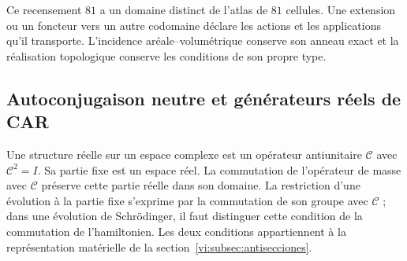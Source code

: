 Ce recensement $81$ a un domaine distinct de l’atlas de $81$ cellules.
Une extension ou un foncteur vers un autre codomaine déclare les actions
et les applications qu’il transporte. L’incidence aréale--volumétrique conserve
son anneau exact et la réalisation topologique conserve les conditions
de son propre type.

\subsection{Autoconjugaison neutre et générateurs réels de CAR}
\label{vi:subsec:majorana-categorias}

Une structure réelle sur un espace complexe est un opérateur antiunitaire
$\mathcal C$ avec $\mathcal C^2=I$. Sa partie fixe est un espace réel.
La commutation de l’opérateur de masse avec $\mathcal C$ préserve cette
partie réelle dans son domaine. La restriction d’une évolution à la partie
fixe s’exprime par la commutation de son groupe avec $\mathcal C$ ;
dans une évolution de Schr\"odinger, il faut distinguer cette condition
de la commutation de l’hamiltonien. Les deux conditions appartiennent à la
représentation matérielle de la section~\ref{vi:subsec:antisecciones}.

